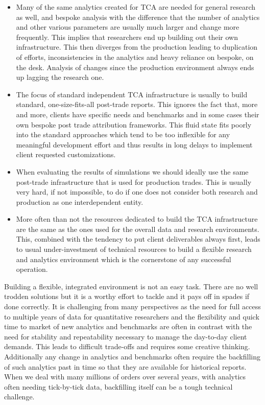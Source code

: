 \begin{itemize}
\item Many of the same analytics created for TCA are needed for general research as well, and bespoke analysis with the difference that the number of analytics and other various parameters are usually much larger and change more frequently. This implies that researchers end up building out their own infrastructure. This then diverges from the production leading to duplication of efforts, inconsistencies in the analytics and heavy reliance on bespoke, on the desk. Analysis of changes since the production environment always ends up lagging the research one.

\item The focus of standard independent TCA infrastructure is usually to build standard, one-size-fits-all post-trade reports. This ignores the fact that, more and more, clients have specific needs and benchmarks and in some cases their own bespoke post trade attribution frameworks. This fluid state fits poorly into the standard approaches which tend to be too inflexible for any meaningful development effort and thus results in long delays to implement client requested customizations.

\item When evaluating the results of simulations we should ideally use the same post-trade infrastructure that is used for production trades. This is usually very hard, if not impossible, to do if one does not consider both research and production as one interdependent entity.

\item More often than not the resources dedicated to build the TCA infrastructure are the same as the ones used for the overall data and research environments. This, combined with the tendency to put client deliverables always first, leads to usual under-investment of technical resources to build a flexible research and analytics environment which is the cornerstone of any successful operation.
\end{itemize}


Building a flexible, integrated environment is not an easy task. There are no well trodden solutions but it is a worthy effort to tackle and it pays off in spades if done correctly. It is challenging from many perspectives as the need for full access to multiple years of data  for quantitative researchers and the flexibility and quick time to market of new analytics and benchmarks are often in contrast with the need for stability and repeatability necessary to manage the day-to-day client demands. This leads to difficult trade-offs and requires some creative thinking. Additionally any change in analytics and benchmarks often require the backfilling of such analytics past in time so that they are available for historical reports. When we deal with many millions of orders over several years, with analytics often needing tick-by-tick data, backfilling itself can be a tough technical challenge.


